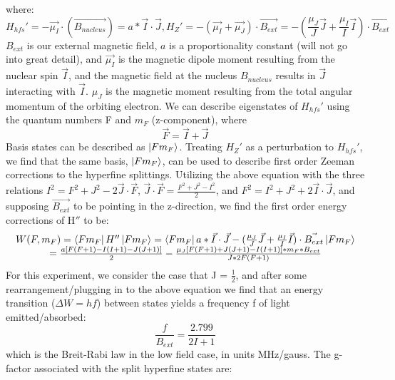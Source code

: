\documentclass{article}
\begin{document}
    where:
    \begin{equation}
        H_{hfs}' = -\vec{\mu_I}\cdot(\vec{B_{nucleus}}) = a*\vec{I}\cdot\vec{J}, H_{Z}' = -(\vec{\mu_I} + \vec{\mu_J})\cdot\vec{B_{ext}} = -(\frac{\mu_J}{J}\vec{J} + \frac{\mu_I}{I}\vec{I})\cdot\vec{B_{ext}}
    \end{equation}
    $B_{ext}$ is our external magnetic field, $a$ is a proportionality constant (will not go into great detail), and $\vec{\mu_I}$ is the magnetic dipole moment resulting from the nuclear spin $\vec{I}$, and the magnetic field at the nucleus $B_{nucleus}$ results in $\vec{J}$ interacting with $\vec{I}$. $\mu_J$ is the magnetic moment resulting from the total angular momentum of the orbiting electron. We can describe eigenstates of $H_{hfs}'$ using the quantum numbers F and $m_F$ (z-component), where 
    \begin{equation}
        \vec{F} = \vec{I} + \vec{J}
    \end{equation}
    Basis states can be described as $\ket{Fm_F}$. Treating $H_{Z}'$ as a perturbation to $H_{hfs}'$, we find that the same basis, $\ket{Fm_F}$, can be used to describe first order Zeeman corrections to the hyperfine splittings. Utilizing the above equation with the three relations $I^2 = F^2 + J^2 - 2\vec{J}\cdot\vec{F}$, $\vec{J}\cdot\vec{F} = \frac{F^2 + J^2 - I^2}{2}$, and $F^2 = I^2 + J^2 + 2\vec{I}\cdot\vec{J}$, and supposing $\vec{B_{ext}}$ to be pointing in the z-direction, we find the first order energy corrections of H$''$ to be:
    \begin{equation}
    \begin{array}{cc}
        W(F,m_F) = \bra{Fm_F}H''\ket{Fm_F} = \bra{Fm_F}a*\vec{I}\cdot\vec{J}-(\frac{\mu_J}{J}\vec{J} + \frac{\mu_I}{I}\vec{I})\cdot\vec{B_{ext}}\ket{Fm_F}\\ = \frac{a[F(F+1) - I(I+1) - J(J+1)]}{2} - \frac{\mu_J[F(F+1) + J(J+1)-I(I+1)]*m_F*B_{ext}}{J*2F(F+1)}
        \end{array}
    \end{equation}
    For this experiment, we consider the case that J = $\frac{1}{2}$, and after some rearrangement/plugging in to the above equation we find that an energy transition ($\Delta W = hf$) between states yields a frequency f of light emitted/absorbed:
    \begin{equation}
        \frac{f}{B_{ext}} = \frac{2.799}{2I+1}
    \end{equation}
    which is the Breit-Rabi law in the low field case, in units MHz/gauss. The g-factor associated with the split hyperfine states are:
\end{document}
